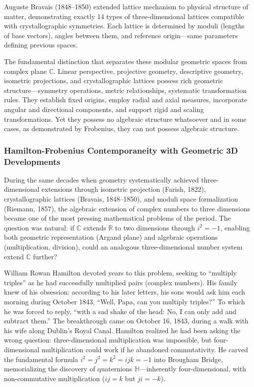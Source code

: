 Auguste Bravais (1848--1850) extended lattice mechanism to physical structure of matter, demonstrating exactly 14 types of three-dimensional lattices compatible with crystallographic symmetries. Each lattice is determined by moduli (lengths of base vectors), angles between them, and reference origin—same parameters defining previous spaces.

The fundamental distinction that separates these modular geometric spaces from complex plane $\mathbb{C}$. Linear perspective, projective geometry, descriptive geometry, isometric projections, and crystallographic lattices possess rich geometric structure—symmetry operations, metric relationships, systematic transformation rules. They establish fixed origins, employ radial and axial measures, incorporate angular and directional components, and support rigid and scaling transformations. Yet they possess no algebraic structure whatsoever and in some cases, as demonstrated by Frobenius, they can not possess algebraic structure.

\subsubsection{Hamilton-Frobenius Contemporaneity with Geometric 3D Developments}

During the same decades when geometry systematically achieved three-dimensional extensions through isometric projection (Farish, 1822), crystallographic lattices (Bravais, 1848–1850), and moduli space formalization (Riemann, 1857), the algebraic extension of complex numbers to three dimensions became one of the most pressing mathematical problems of the period. The question was natural: if $\mathbb{C}$ extends $\mathbb{R}$ to two dimensions through $i^2 = -1$, enabling both geometric representation (Argand plane) and algebraic operations (multiplication, division), could an analogous three-dimensional number system extend $\mathbb{C}$ further?

William Rowan Hamilton devoted years to this problem, seeking to ``multiply triples'' as he had successfully multiplied pairs (complex numbers). His family knew of his obsession: according to his later letters, his sons would ask him each morning during October 1843, ``Well, Papa, can you multiply triples?'' To which he was forced to reply, ``with a sad shake of the head: No, I can only add and subtract them.'' The breakthrough came on October 16, 1843, during a walk with his wife along Dublin's Royal Canal. Hamilton realized he had been asking the wrong question: three-dimensional multiplication was impossible, but four-dimensional multiplication could work if he abandoned commutativity. He carved the fundamental formula $i^2 = j^2 = k^2 = ijk = -1$ into Brougham Bridge, memorializing the discovery of quaternions $\mathbb{H}$—inherently four-dimensional, with non-commutative multiplication ($ij = k$ but $ji = -k$).

